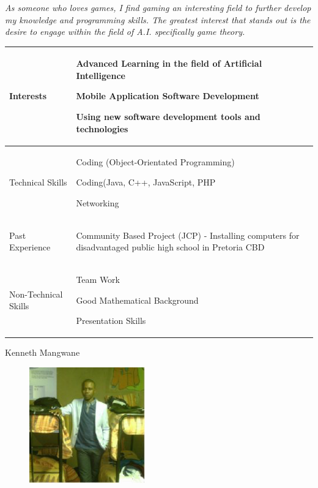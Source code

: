 \documentclass{article}
\begin{document}
 	\textit{As someone who loves games, I find gaming an interesting field to further develop my knowledge and programming skills. The greatest interest that stands out is the desire to engage within the field of A.I. specifically game theory.}

\begin{center}
\begin{tabularx}{1.0\textwidth}{|p{3cm}|X|}
\hline
 {\LARGE Interests} & 
 \begin{compactitem}
     \item {\large Advanced Learning in the field of Artificial Intelligence}
     \item {\large Mobile Application Software Development}
     \item {\large Using new software development tools and technologies}
 \end{compactitem} \\ 
 \hline
 {\LARGE Technical Skills} & 
 \begin{compactitem}
     \item {\large Coding (Object-Orientated Programming)} 
     \item {\large Coding(Java, C++, JavaScript, PHP}
     \item {\large Networking}
 \end{compactitem} \\ 
 \hline
 {\LARGE Past Experience} & 
 \begin{compactitem}
     \item {\large Community Based Project (JCP) - Installing computers for disadvantaged public high school in Pretoria CBD}
 \end{compactitem} \\ 
 \hline
 {\LARGE Non-Technical Skills} & 
 \begin{compactitem}
     \item {\large Team Work}
     \item {\large Good Mathematical Background}
     \item {\large Presentation Skills}
 \end{compactitem} \\
 \hline 
\end{tabularx}
\end{center}
\pagebreak
{\huge Kenneth Mangwane}
\begin{figure}[h]
\centering
\includegraphics[width=5cm, height=5cm]{Kenneth.eps} 
\end{figure}
\end{document}
